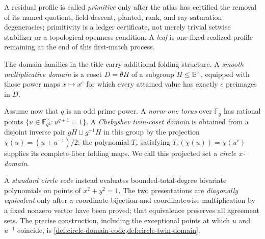 \documentclass[12pt,a4paper]{amsart}
\numberwithin{equation}{section}
\theoremstyle{remark}
\newcommand{\F}{\mathbb F}
\newcommand{\B}{\mathbb B}
\begin{document}
A residual profile is called \emph{primitive} only after the atlas has certified the
removal of its named quotient, field-descent, planted, rank, and ray-saturation
degeneracies; primitivity is a ledger certificate, not merely trivial
setwise stabilizer or a topological openness condition.  A \emph{leaf} is
one fixed realized profile remaining at the end of this first-match
process.

The domain families in the title carry additional folding structure.  A
\emph{smooth multiplicative domain} is a coset \(D=\theta H\) of a
subgroup \(H\le\B^\times\), equipped with those power maps
\(x\mapsto x^c\) for which every attained value has exactly \(c\)
preimages in \(D\).

Assume now that \(q\) is an odd prime power.  A \emph{norm-one torus} over \(\F_q\) has rational
points \(\{u\in\F_{q^2}^\times:u^{q+1}=1\}\).  A
\emph{Chebyshev twin-coset domain} is obtained from a disjoint inverse pair
\(gH\sqcup g^{-1}H\) in this group by the projection
\(\chi(u)=(u+u^{-1})/2\); the polynomial \(T_c\) satisfying
\(T_c(\chi(u))=\chi(u^c)\) supplies its complete-fiber folding maps.  We
call this projected set a \emph{circle \(x\)-domain}.

A \emph{standard circle code} instead evaluates bounded-total-degree
bivariate polynomials on points of \(x^2+y^2=1\).  The two presentations
are \emph{diagonally equivalent} only after a coordinate bijection and
coordinatewise multiplication by a fixed nonzero vector have been proved;
that equivalence preserves all agreement sets.  The precise construction,
including the exceptional points at which \(u\) and \(u^{-1}\) coincide,
is \cref{def:circle-domain-code,def:circle-twin-domain}.
\end{document}

